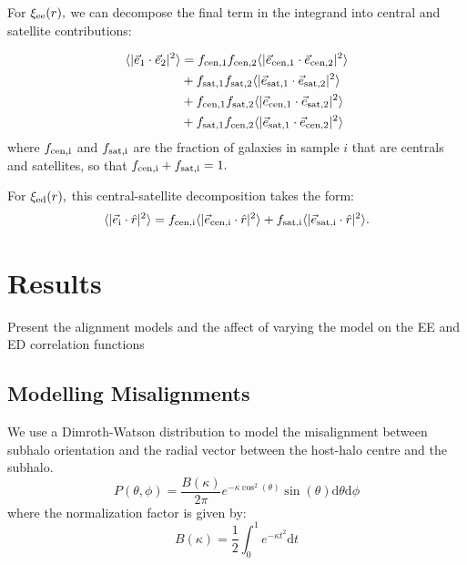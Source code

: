 \documentclass[fleqn,usenatbib]{mnras}
\newcommand{\tpcf}[1]{\xi_{\rm #1}}
\newcommand{\evec}[1]{\vec{e}_{\rm #1}}
\newcommand{\evechat}[1]{\hat{e}_{\rm #1}}
\newcommand{\mean}[1]{\langle #1 \rangle}
\begin{document}
For $\tpcf{ee}(r),$ we can decompose the final term in the integrand into central and satellite contributions:

\begin{align}
\begin{split}
\mean{\vert\evec{1}\cdot\evec{2}\vert^{2}} &= 
f_{\rm cen, 1}f_{\rm cen, 2}\mean{\vert\evec{cen, 1}\cdot\evec{cen, 2}\vert^{2}} \\
& + f_{\rm sat, 1}f_{\rm sat, 2}\mean{\vert\evec{sat, 1}\cdot\evec{sat, 2}\vert^{2}} \\
&+ f_{\rm cen, 1}f_{\rm sat, 2}\mean{\vert\evec{cen, 1}\cdot\evec{sat, 2}\vert^{2}} \\
& + f_{\rm sat, 1}f_{\rm cen, 2}\mean{\vert\evec{sat, 1}\cdot\evec{cen, 2}\vert^{2}}  
\end{split}
\end{align}
where $f_{\rm cen, i}$ and $f_{\rm sat, i}$ are the fraction of galaxies in sample $i$ that are centrals and satellites, so that $f_{\rm cen, i} + f_{\rm sat, i}=1.$ 

For $\tpcf{ed}(r),$ this central-satellite decomposition takes the form:
\begin{align}
\begin{split}
 \mean{\vert\evec{i}\cdot\hat{r}\vert^{2}} =   f_{\rm cen, i}\mean{\vert\evec{cen, i}\cdot\hat{r}\vert^{2}} +  f_{\rm sat, i}\mean{\vert\evec{sat, i}\cdot\hat{r}\vert^{2}}.
\end{split}
\end{align}




\section{Results}
Present the alignment models and the affect of varying the model on the EE and ED correlation functions

\subsection{Modelling Misalignments}
We use a Dimroth-Watson distribution to model the misalignment between subhalo orientation and the radial vector between the host-halo centre and the subhalo.   
%
\begin{equation}
P(\theta,\phi) = \frac{B(\kappa)}{2\pi}e^{-\kappa\cos^2(\theta)}\sin(\theta)\mathrm{d}\theta\mathrm{d}\phi
\label{eq:watson}
\end{equation}
%
where the normalization factor is given by:
%
\begin{equation}
B(\kappa) = \frac{1}{2}\int_0^1 e^{-\kappa t^2}\mathrm{d}t
\end{equation}
%
\end{document}
